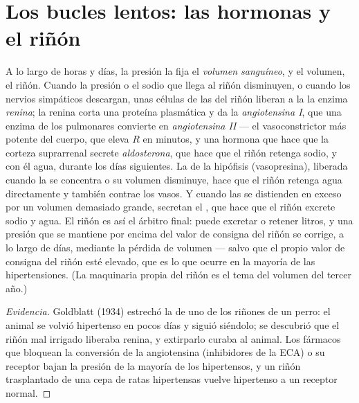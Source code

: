 \section{Los bucles lentos: las hormonas y el riñón}

\begin{proposition}\label{prop:b2:blood-pressure:raas}
A lo largo de horas y días, la presión la fija el \emph{volumen
sanguíneo}, y el volumen, el riñón. Cuando la presión o el sodio que llega
al riñón disminuyen, o cuando los nervios simpáticos descargan, unas
células de las  del riñón liberan a la  la enzima
\emph{renina}; la renina corta una proteína plasmática y da la
\emph{angiotensina I}, que una enzima de los  pulmonares
convierte en \emph{angiotensina II} --- el vasoconstrictor más potente del
cuerpo, que eleva $R$ en minutos, y una hormona que hace que la corteza
suprarrenal secrete \emph{aldosterona}, que hace que el riñón retenga
sodio, y con él agua, durante los días siguientes. La \emph{} de la hipófisis (vasopresina), liberada cuando la  se
concentra o su volumen disminuye, hace que el riñón retenga agua
directamente y también contrae los vasos. Y cuando las  se
distienden en exceso por un volumen demasiado grande, secretan el
\emph{}, que hace que el riñón excrete sodio y agua.
El riñón es así el árbitro final: puede excretar o retener litros, y una
presión que se mantiene por encima del valor de consigna del riñón se
corrige, a lo largo de días, mediante la pérdida de volumen --- salvo que
el propio valor de consigna del riñón esté elevado, que es lo que ocurre en
la mayoría de las hipertensiones. (La maquinaria propia del riñón es el
tema del volumen del tercer año.)
\end{proposition}
\begin{proof}[Evidencia]
Goldblatt (1934) estrechó la  de uno de los riñones de un perro:
el animal se volvió hipertenso en pocos días y siguió siéndolo; se
descubrió que el riñón mal irrigado liberaba renina, y extirparlo curaba
al animal. Los fármacos que bloquean la conversión de la angiotensina
(inhibidores de la ECA) o su receptor bajan la presión de la mayoría de
los hipertensos, y un riñón trasplantado de una cepa de ratas hipertensas
vuelve hipertenso a un receptor normal.
\end{proof}

